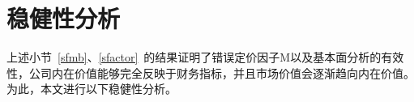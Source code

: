 
\section{稳健性分析}
上述小节~\ref{sfmb}、\ref{sfactor}~的结果证明了错误定价因子M以及基本面分析的有效性，公司内在价值能够完全反映于财务指标，并且市场价值会逐渐趋向内在价值。为此，本文进行以下稳健性分析。

